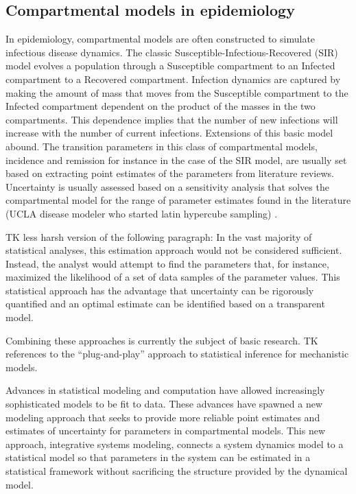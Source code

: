 \subsection{Compartmental models in epidemiology}
In epidemiology, compartmental models are often constructed to
simulate infectious disease dynamics.\cite{Anderson_Infectious_1991}
The classic Susceptible-Infectious-Recovered (SIR) model evolves a
population through a Susceptible compartment to an Infected
compartment to a Recovered
compartment.\cite{Kermack_Contribution_1927} Infection dynamics are
captured by making the amount of mass that moves from the Susceptible
compartment to the Infected compartment dependent on the product of
the masses in the two compartments. This dependence implies that the
number of new infections will increase with the number of current
infections. Extensions of this basic model abound.\cite{Daley_Epidemic_2001,Brauer_Mathematical_2001} The transition
parameters in this class of compartmental models, incidence and
remission for instance in the case of the SIR model, are usually set
based on extracting point estimates of the parameters from literature
reviews. Uncertainty is usually assessed based on a sensitivity
analysis that solves the compartmental model for the range of
parameter estimates found in the literature (UCLA disease modeler who
started latin hypercube sampling) \cite{Nagelkerke_Modelling_2002,
  Brandeau_Screening_1993, Broutin_Impact_2010}.

TK less harsh version of the following paragraph: In the vast majority
of statistical analyses, this estimation approach would not be
considered sufficient. Instead, the analyst would attempt to find the
parameters that, for instance, maximized the likelihood of a set of
data samples of the parameter values. This statistical approach has
the advantage that uncertainty can be rigorously quantified and an
optimal estimate can be identified based on a transparent model.

Combining these approaches is currently the subject of basic research.
TK references to the ``plug-and-play'' approach to statistical
inference for mechanistic models.

Advances in statistical modeling and computation have allowed
increasingly sophisticated models to be fit to data. These advances
have spawned a new modeling approach that seeks to provide more
reliable point estimates and estimates of uncertainty for parameters
in compartmental models. This new approach, integrative systems
modeling, connects a system dynamics model to a statistical model so
that parameters in the system can be estimated in a statistical
framework without sacrificing the structure provided by the dynamical
model.

